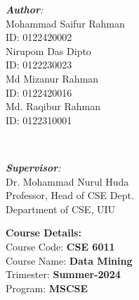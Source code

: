 \documentclass[12pt]{book} %
\begin{document}
\begin{titlepage}
\begin{minipage}{0.5\textwidth}
    \begin{flushleft} \small
    \emph{\textbf{\large Author}:}\\
    Mohammad Saifur Rahman  \\ %
    ID: 0122420002\\
    Nirupom Das Dipto  \\ %
    ID: 0122230023\\
    Md Mizanur Rahman \\ %
    ID: 0122420016\\
    Md. Raqibur Rahman  \\ %
    ID: 0122310001\\
    \end{flushleft}
    \end{minipage}
    ~
    \begin{minipage}{0.4\textwidth}
    \begin{flushright} \large
    \emph{\textbf{Supervisor}:} \\
    Dr. Mohammad Nurul Huda  \\ %
    Professor, Head of CSE Dept. \\
    Department of CSE, UIU\\
    \end{flushright}

    \vspace{.1cm}

    \begin{flushright}
        \textbf{Course Details:} \\
        \vspace{0.2cm}
        Course Code: \textbf{CSE 6011}\\
        Course Name: \textbf{Data Mining}\\
        Trimester: \textbf{Summer-2024}\\
        Program: \textbf{MSCSE}
    \end{flushright}
\end{minipage}
    
\vspace{2cm}
    
    
    



\end{titlepage}
\end{document}

